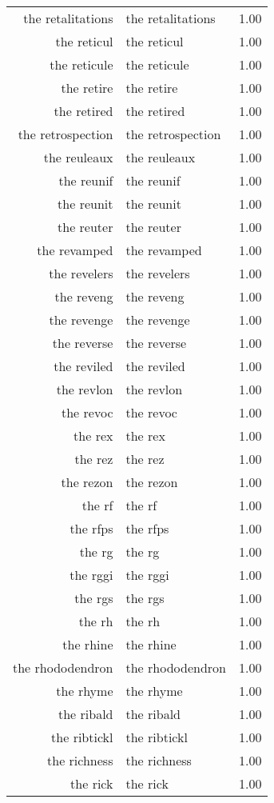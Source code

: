 \begin{table}[ht]
\begin{tabular}{rlr}
  the retalitations & the retalitations & 1.00 \\ 
  the reticul & the reticul & 1.00 \\ 
  the reticule & the reticule & 1.00 \\ 
  the retire & the retire & 1.00 \\ 
  the retired & the retired & 1.00 \\ 
  the retrospection & the retrospection & 1.00 \\ 
  the reuleaux & the reuleaux & 1.00 \\ 
  the reunif & the reunif & 1.00 \\ 
  the reunit & the reunit & 1.00 \\ 
  the reuter & the reuter & 1.00 \\ 
  the revamped & the revamped & 1.00 \\ 
  the revelers & the revelers & 1.00 \\ 
  the reveng & the reveng & 1.00 \\ 
  the revenge & the revenge & 1.00 \\ 
  the reverse & the reverse & 1.00 \\ 
  the reviled & the reviled & 1.00 \\ 
  the revlon & the revlon & 1.00 \\ 
  the revoc & the revoc & 1.00 \\ 
  the rex & the rex & 1.00 \\ 
  the rez & the rez & 1.00 \\ 
  the rezon & the rezon & 1.00 \\ 
  the rf & the rf & 1.00 \\ 
  the rfps & the rfps & 1.00 \\ 
  the rg & the rg & 1.00 \\ 
  the rggi & the rggi & 1.00 \\ 
  the rgs & the rgs & 1.00 \\ 
  the rh & the rh & 1.00 \\ 
  the rhine & the rhine & 1.00 \\ 
  the rhododendron & the rhododendron & 1.00 \\ 
  the rhyme & the rhyme & 1.00 \\ 
  the ribald & the ribald & 1.00 \\ 
  the ribtickl & the ribtickl & 1.00 \\ 
  the richness & the richness & 1.00 \\ 
  the rick & the rick & 1.00 \\ 

\end{tabular}
\end{table}
